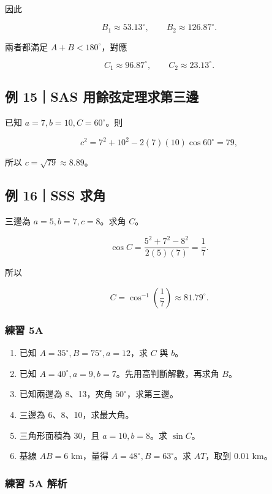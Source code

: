 \documentclass[11pt,a4paper]{article}
\providecommand{\tightlist}{%
  \setlength{\itemsep}{0pt}\setlength{\parskip}{0pt}}
\begin{document}
因此

\[
B_1\approx53.13^\circ,\qquad B_2\approx126.87^\circ.
\]

兩者都滿足 \(A+B<180^\circ\)，對應

\[
C_1\approx96.87^\circ,\qquad C_2\approx23.13^\circ.
\]

\subsection{例 15｜SAS 用餘弦定理求第三邊}\label{ux4f8b-15sas-ux7528ux9918ux5f26ux5b9aux7406ux6c42ux7b2cux4e09ux908a}

已知 \(a=7,b=10,C=60^\circ\)。則

\[
c^2=7^2+10^2-2(7)(10)\cos60^\circ=79,
\]

所以 \(\boxed{c=\sqrt{79}\approx8.89}\)。

\subsection{例 16｜SSS 求角}\label{ux4f8b-16sss-ux6c42ux89d2}

三邊為 \(a=5,b=7,c=8\)。求角 \(C\)。

\[
\cos C=\frac{5^2+7^2-8^2}{2(5)(7)}=\frac17.
\]

所以

\[
C=\cos^{-1}\!\left(\frac17\right)\approx\boxed{81.79^\circ}.
\]

\subsubsection{練習 5A}\label{ux7df4ux7fd2-5a}

\begin{enumerate}
\def\labelenumi{\arabic{enumi}.}
\tightlist
\item
  已知 \(A=35^\circ,B=75^\circ,a=12\)，求 \(C\) 與 \(b\)。
\item
  已知 \(A=40^\circ,a=9,b=7\)。先用高判斷解數，再求角 \(B\)。
\item
  已知兩邊為 8、13，夾角 \(50^\circ\)，求第三邊。
\item
  三邊為 6、8、10，求最大角。
\item
  三角形面積為 30，且 \(a=10,b=8\)。求 \(\sin C\)。
\item
  基線 \(AB=6\) km，量得 \(A=48^\circ,B=63^\circ\)。求 \(AT\)，取到 \(0.01\) km。
\end{enumerate}

\subsubsection{練習 5A 解析}\label{ux7df4ux7fd2-5a-ux89e3ux6790}
\end{document}
